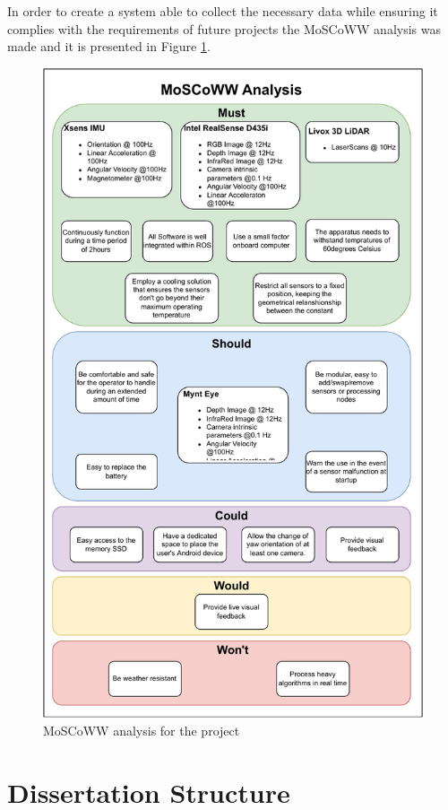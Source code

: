 In order to create a system able to collect the necessary data while ensuring it complies with the requirements of future projects the MoSCoWW analysis was made and it is presented in Figure \ref{fig: moscoww}.

\begin{figure}[H]
    \centering
    \includegraphics[width=0.875\linewidth]{images/introduction/moscoww_analysis.pdf}
    \caption{MoSCoWW analysis for the project}
    \label{fig: moscoww}
\end{figure}

\section{Dissertation Structure}